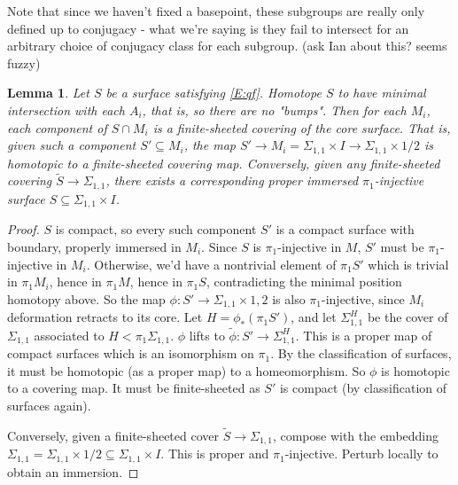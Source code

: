 \documentclass[12pt]{amsart}
\newtheorem{lemma}[theorem]{Lemma}
\theoremstyle{definition}
\newcommand{\x}{\times}
\newcommand{\Si}{\Sigma}
\newcommand{\cin}{\subseteq}
\begin{document}
Note that since we
haven't fixed a basepoint, these subgroups are really only defined up to
conjugacy - what we're saying is they fail to intersect for an arbitrary choice
of conjugacy class for each subgroup. (ask Ian about this? seems fuzzy)

\begin{lemma}

Let $S$ be a surface satisfying \eqref{E:qf}. Homotope $S$ to have minimal
intersection with each $A_i$, that is, so there are no "bumps".  Then for each
$M_i$, each component of $S \cap M_i$ is a finite-sheeted covering of the core
surface.  That is, given such a component $S' \cin M_i$, the map $S' \to M_i
= \Si_{1,1}\x I \to \Si_{1,1}\x{1/2}$ is homotopic to a finite-sheeted covering
map. Conversely, given any finite-sheeted covering $\widetilde{S} \to
\Si_{1,1}$, there exists a corresponding proper immersed $\pi_1$-injective
surface $S \cin \Si_{1,1}\x I$.

\end{lemma}
\begin{proof}

$S$ is compact, so every such component $S'$ is a compact surface with
boundary, properly immersed in $M_i$. Since $S$ is $\pi_1$-injective in $M$,
$S'$ must be $\pi_1$-injective in $M_i$. Otherwise, we'd have a nontrivial
element of $\pi_1S'$ which is trivial in $\pi_1M_i$, hence in $\pi_1M$, hence
in $\pi_1S$, contradicting the minimal position homotopy above. So the map
$\phi : S'\to\Si_{1,1}\x{1,2}$ is also $\pi_1$-injective, since $M_i$
deformation retracts to its core. Let $H = \phi_*(\pi_1S')$, and let
$\Si_{1,1}^H$ be the cover of $\Si_{1,1}$ associated to $H<\pi_1\Si_{1,1}$.
$\phi$ lifts to $\widetilde{\phi}\colon S'\to \Si_{1,1}^H$. This is a proper
map of compact surfaces which is an isomorphism on $\pi_1$.  By the
classification of surfaces, it must be homotopic (as a proper map) to
a homeomorphism. So $\phi$ is homotopic to a covering map. It must be
finite-sheeted as $S'$ is compact (by classification of surfaces again).

Conversely, given a finite-sheeted cover $\widetilde{S}\to \Si_{1,1}$, compose
with the embedding $\Si_{1,1} = \Si_{1,1}\x{1/2} \cin \Si_{1,1}\x I$. This is
proper and $\pi_1$-injective.  Perturb locally to obtain an immersion.

\end{proof}
\end{document}
